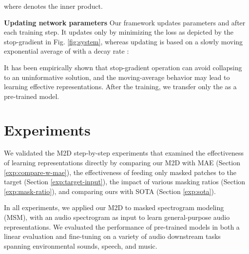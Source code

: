 \documentclass{article}
\begin{document}
where  denotes the inner product.

\vspace{0.1cm}
\noindent\textbf{Updating network parameters}\hspace{0.2cm}
Our framework updates parameters  and  after each training step. It updates  only by minimizing the loss  as depicted by the stop-gradient in Fig. \ref{fig:system}, whereas updating  is based on a slowly moving exponential average of  with a decay rate :


It has been empirically shown that stop-gradient operation can avoid collapsing to an uninformative solution, and the moving-average behavior may lead to learning effective representations\cite{Xinlei2021SimSham}.
After the training, we transfer only the  as a pre-trained model.




\section{Experiments} \label{sec:experiments}
We validated the M2D step-by-step experiments that examined the effectiveness of learning representations directly by comparing our M2D with MAE (Section \ref{exp:compare-w-mae}), the effectiveness of feeding only masked patches to the target (Section \ref{exp:target-input}), the impact of various masking ratios (Section \ref{exp:mask-ratio}), and comparing ours with SOTA (Section \ref{exp:sota}).

In all experiments, we applied our M2D to masked spectrogram modeling (MSM)\cite{niizumi2022msm-mae}, with an audio spectrogram as input to learn general-purpose audio representations.
We evaluated the performance of pre-trained models in both a linear evaluation and fine-tuning on a variety of audio downstream tasks spanning environmental sounds, speech, and music.
\end{document}
